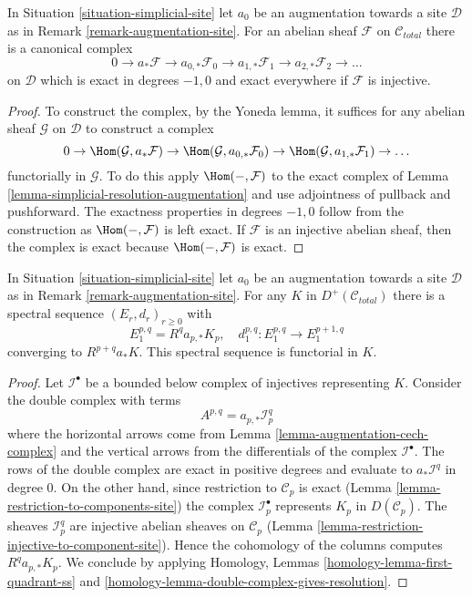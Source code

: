 \begin{lemma}
\label{lemma-augmentation-cech-complex}
In Situation \ref{situation-simplicial-site} let
$a_0$ be an augmentation towards a site $\mathcal{D}$
as in Remark \ref{remark-augmentation-site}.
For an abelian sheaf $\mathcal{F}$ on $\mathcal{C}_{total}$
there is a canonical complex
$$
0 \to a_*\mathcal{F} \to a_{0, *}\mathcal{F}_0 \to a_{1, *}\mathcal{F}_1 \to
a_{2, *}\mathcal{F}_2 \to \ldots
$$
on $\mathcal{D}$ which is exact in degrees $-1, 0$ and
exact everywhere if $\mathcal{F}$ is injective.
\end{lemma}

\begin{proof}
To construct the complex, by the Yoneda lemma, it suffices for any
abelian sheaf $\mathcal{G}$ on $\mathcal{D}$ to construct a complex
$$
0 \to \Hom(\mathcal{G}, a_*\mathcal{F}) \to
\Hom(\mathcal{G}, a_{0, *}\mathcal{F}_0) \to
\Hom(\mathcal{G}, a_{1, *}\mathcal{F}_1) \to \ldots
$$
functorially in $\mathcal{G}$. To do this apply $\Hom(-, \mathcal{F})$
to the exact complex of Lemma \ref{lemma-simplicial-resolution-augmentation}
and use adjointness of pullback and pushforward.
The exactness properties in degrees $-1, 0$ follow from
the construction as $\Hom(-, \mathcal{F})$ is left exact.
If $\mathcal{F}$ is an injective abelian sheaf, then the
complex is exact because $\Hom(-, \mathcal{F})$ is exact.
\end{proof}

\begin{lemma}
\label{lemma-augmentation-spectral-sequence}
In Situation \ref{situation-simplicial-site} let
$a_0$ be an augmentation towards a site $\mathcal{D}$
as in Remark \ref{remark-augmentation-site}.
For any $K$ in $D^+(\mathcal{C}_{total})$ there is a spectral
sequence 
$(E_r, d_r)_{r \geq 0}$ with
$$
E_1^{p, q} = R^qa_{p, *} K_p,\quad
d_1^{p, q} : E_1^{p, q} \to E_1^{p + 1, q}
$$
converging to $R^{p + q}a_*K$. This spectral sequence is functorial in $K$.
\end{lemma}

\begin{proof}
Let $\mathcal{I}^\bullet$ be a bounded below complex of injectives
representing $K$. Consider the double complex with terms
$$
A^{p, q} = a_{p, *}\mathcal{I}^q_p
$$
where the horizontal arrows come from
Lemma \ref{lemma-augmentation-cech-complex}
and the vertical arrows from the differentials of the
complex $\mathcal{I}^\bullet$. The rows of the double complex are exact
in positive degrees and evaluate to $a_*\mathcal{I}^q$ in degree $0$.
On the other hand, since restriction to $\mathcal{C}_p$ is exact
(Lemma \ref{lemma-restriction-to-components-site})
the complex $\mathcal{I}_p^\bullet$ represents $K_p$ in
$D(\mathcal{C}_p)$. The sheaves $\mathcal{I}_p^q$ are injective
abelian sheaves on $\mathcal{C}_p$
(Lemma \ref{lemma-restriction-injective-to-component-site}).
Hence the cohomology of the columns computes $R^qa_{p, *}K_p$.
We conclude by applying
Homology, Lemmas \ref{homology-lemma-first-quadrant-ss} and
\ref{homology-lemma-double-complex-gives-resolution}.
\end{proof}





